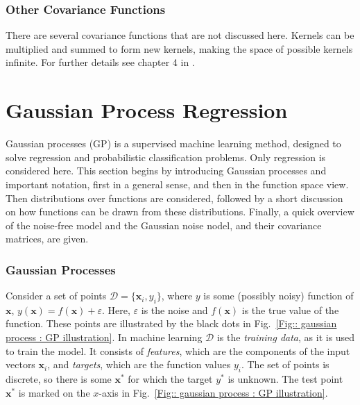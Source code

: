 \documentclass[twoside,english]{uiofysmaster}
\begin{document}
\subsubsection{Other Covariance Functions}

There are several covariance functions that are not discussed here. Kernels can be multiplied and summed to form new kernels, making the space of possible kernels infinite. For further details see chapter 4 in \cite{rasmussen2006gaussian}.




\section{Gaussian Process Regression}\label{Sec: gaussian process : Gaussian Process Regression}

Gaussian processes (GP) is a supervised machine learning method, designed to solve regression and probabilistic classification problems. Only regression is considered here. This section begins by introducing Gaussian processes and important notation, first in a general sense, and then in the function space view. Then distributions over functions are considered, followed by a short discussion on how functions can be drawn from these distributions. Finally, a quick overview of the noise-free model and the Gaussian noise nodel, and their covariance matrices, are given.

\subsubsection{Gaussian Processes}

Consider a set of points $\mathcal{D} = \{\textbf{x}_i, y_i\}$, where $y$ is some (possibly noisy) function of $\textbf{x}$, $y(\textbf{x}) = f(\textbf{x}) + \varepsilon$. Here, $\varepsilon$ is the noise and $f(\textbf{x})$ is the true value of the function. These points are illustrated by the black dots in Fig.~\ref{Fig:: gaussian process : GP illustration}. In machine learning $\mathcal{D}$ is the \textit{training data}, as it is used to train the model. It consists of \textit{features}, which are the components of the input vectors $\textbf{x}_i$, and \textit{targets}, which are the function values $y_i$. The set of points is discrete, so there is some $\textbf{x}^*$ for which the target $y^*$ is unknown. The test point $\textbf{x}^*$ is marked on the $x$-axis in Fig.~\ref{Fig:: gaussian process : GP illustration}.
\end{document}
